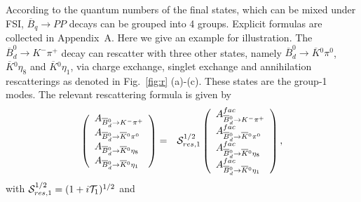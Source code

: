 \documentclass[aps,preprint,floats,epsf,epsfig,nofootinbib,letter]{revtex4}
\newcommand{\ov}{\overline}
\newcommand{\Sc}{{\cal S}}
\begin{document}
According to the quantum numbers of the final states, which can be mixed under FSI, $\overline B_q\to PP$ decays can be grouped into 4 groups.
Explicit formulas are collected in Appendix~A. 
Here we give an example for illustration. 
The $\overline B^0_d\to K^-\pi^+$ decay can rescatter with three other states, namely $\overline B^0_d\to \ov K{}^0\pi^0$, $\ov K{}^0\eta_8$ and $\ov K{}^0\eta_1$, via charge exchange, singlet exchange and annihilation rescatterings as denoted in Fig.~\ref{fig:r} (a)-(c). These states are the group-1 modes.
The relevant rescattering formula is given by
\begin{eqnarray}
\left(
\begin{array}{l}
 A_{\ov B {}^0_{d}\to K^-\pi^+}\\
 A_{\ov B {}^0_{d}\to \ov K {}^0 \pi^0}\\
 A_{\ov B {}^0_{d}\to \ov K {}^0 \eta_8}\\
 A_{\ov B {}^0_{d}\to \ov K {}^0 \eta_1}
\end{array}
\right)
 &=& \Sc_{res,1}^{1/2}
 \left(
\begin{array}{l}
 A^{fac}_{\ov B {}^0_{d}\to K^-\pi^+}\\
 A^{fac}_{\ov B {}^0_{d}\to \ov K {}^0 \pi^0}\\
 A^{fac}_{\ov B {}^0_{d}\to \ov K {}^0 \eta_8}\\
 A^{fac}_{\ov B {}^0_{d}\to \ov K {}^0 \eta_1}
\end{array}
\right),
 \label{eq:FSIB0Kpi}
\end{eqnarray}
with
${\cal S}^{1/2}_{res,1}=(1+i{\cal T}_1)^{1/2}$ and
\end{document}
